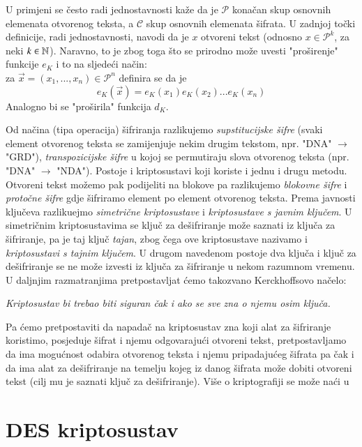 \documentclass[a4paper,oneside,12pt]{memoir} %
\begin{document}
\begin{spacing}{1.5}
\begin{defn}
\begin{itemize}
\end{itemize}
\end{defn}
\begin{rem}
U primjeni se često radi jednostavnosti kaže da je $\mathcal{P}$ konačan skup osnovnih elemenata otvorenog teksta, a $\mathcal{C}$ skup osnovnih elemenata šifrata. U zadnjoj točki definicije, radi jednostavnosti, navodi da je $x$ otvoreni tekst (odnosno $x \in \mathcal{P}^k$, za neki $k \in \mathbb{N}$). Naravno, to je zbog toga što se prirodno može uvesti "proširenje" funkcije $e_K$ i to na sljedeći način: \\ 
za $\vec{x}=(x_1,...,x_n) \in \mathcal{P}^n$ definira se da je \[e_K(\vec{x})=e_K(x_1)e_K(x_2)...e_K(x_n)\]
Analogno bi se "proširila" funkcija $d_K$. 
\end{rem}
Od načina (tipa operacija) šifriranja razlikujemo \textit{supstitucijske šifre} (svaki element otvorenog teksta se zamijenjuje nekim drugim tekstom, npr. "DNA" $\to$ "GRD"), \textit{transpozicijske šifre} u kojoj se permutiraju slova otvorenog teksta (npr. "DNA" $\to$ "NDA"). Postoje i kriptosustavi koji koriste i jednu i drugu metodu. Otvoreni tekst možemo pak podijeliti na blokove pa razlikujemo \textit{blokovne šifre} i  \textit{protočne šifre}	gdje šifriramo element po element otvorenog teksta. Prema javnosti ključeva razlikuejmo \textit{simetrične kriptosustave} i \textit{kriptosustave s javnim ključem}. U simetričnim kriptosustavima se ključ za dešifriranje može saznati iz ključa za šifriranje, pa je taj ključ \textit{tajan}, zbog čega ove kriptosustave nazivamo i \textit{kriptosustavi s tajnim ključem}. U drugom navedenom postoje dva ključa i ključ za dešifriranje se ne može izvesti iz ključa za šifriranje u nekom razumnom vremenu. U daljnjim razmatranjima pretpostavljat ćemo takozvano Kerckhoffsovo načelo:
\begin{center}
	\textit{Kriptosustav bi trebao biti siguran čak i ako se sve zna o njemu osim ključa.}
\end{center}
Pa ćemo pretpostaviti da napadač na kriptosustav zna koji alat za šifriranje koristimo, posjeduje šifrat i njemu odgovarajući otvoreni tekst, pretpostavljamo da ima mogućnost odabira otvorenog teksta i njemu pripadajućeg šifrata pa čak i da ima alat za dešifriranje na temelju kojeg iz danog šifrata može dobiti otvoreni tekst (cilj mu je saznati ključ za dešifriranje).
Više o kriptografiji se može naći u \cite{duje}
\section{DES kriptosustav}	

\end{spacing}
\end{document}

